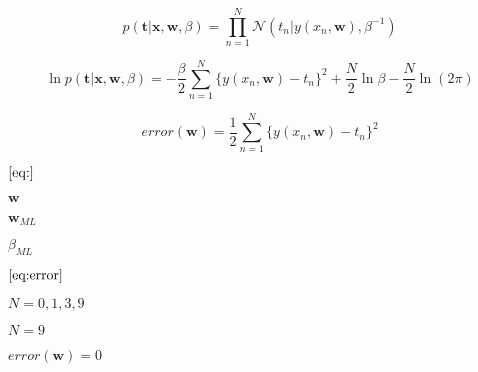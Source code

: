 \documentclass[10pt]{book}
\begin{document}
\begin{mdSnippets}
\begin{mdDisplaySnippet}[e01e72d10d1696e6d2a94f926b5480f5]%
\[%
p(\textbf{t}|\textbf{x},\textbf{w},\beta)=\prod_{n=1}^{N}\mathcal{N}(t_n|y(x_n,\textbf{w}),\beta^{-1})
\]%
\end{mdDisplaySnippet}%
\begin{mdDisplaySnippet}[14df7867dc33b969ab7cf77f03735a69]%
\[%
\ln{}p(\textbf{t}|\textbf{x},\textbf{w},\beta)=-\frac{\beta}{2}\sum_{n=1}^{N} \{y(x_n,\textbf{w})-t_n\}^2 +\frac{N}{2}\ln\beta-\frac{N}{2}\ln (2\pi)
\]%
\end{mdDisplaySnippet}%
\begin{mdDisplaySnippet}[04cbdfe605e7e5f10c8c37c1f662d8a1]%
\[%
error(\textbf{w})=\frac{1}{2}\sum_{n=1}^{N} \{y(x_n,\textbf{w})-t_n\}^2
\]%
\end{mdDisplaySnippet}%
\begin{mdInlineSnippet}[6dbef80b93a16c5f0b2c89d29722c33a]%
$\eqref{eq:}$\end{mdInlineSnippet}%
\begin{mdInlineSnippet}[e8d1025023b4b2aa1dda755aa92e085d]%
$\textbf{w}$\end{mdInlineSnippet}%
\begin{mdInlineSnippet}[5251d69b509df917e590d2694167bdc4]%
$\textbf{w}_{ML}$\end{mdInlineSnippet}%
\begin{mdInlineSnippet}[288bd7278e412fc8069000a9e66a9702]%
$\beta_{ML}$\end{mdInlineSnippet}%
\begin{mdInlineSnippet}[072b4941023c84c0d52ee2e3c23c4495]%
$\eqref{eq:error}$\end{mdInlineSnippet}%
\begin{mdInlineSnippet}[55b8c0b10af10aaec1e2c7af39ad0b8c]%
$N=0,1,3,9$\end{mdInlineSnippet}%
\begin{mdInlineSnippet}[585cd78c368b5c8db9642eaf2a530bf3]%
$N=9$\end{mdInlineSnippet}%
\begin{mdInlineSnippet}[56e13d7f7a7911dedbce3d49b3941cf3]%
$error(\textbf{w})=0$\end{mdInlineSnippet}%

\end{mdSnippets}
\end{document}
